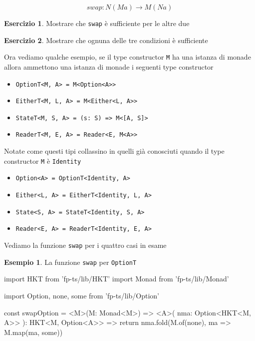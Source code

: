 \documentclass[12pt]{article}
\theoremstyle{definition}
\newtheorem{example}{Esempio}[section]
\newtheorem{exercise}{Esercizio}[section]
\newenvironment{code}
  {\vspace{0.5cm} \VerbatimEnvironment\begin{typescriptcode}}
  {\end{typescriptcode} \vspace{0.2cm}}
\begin{document}
$$
swap: N ( M a ) \rightarrow M ( N a )
$$

\begin{exercise}
Mostrare che \texttt{swap} è sufficiente per le altre due
\end{exercise}

\begin{exercise}
Mostrare che ognuna delle tre condizioni è sufficiente
\end{exercise}

Ora vediamo qualche esempio, se il type constructor \texttt{M} ha una istanza di monade
allora ammettono una istanza di monade i seguenti type constructor

\begin{itemize}
  \item \texttt{OptionT<M, A> = M<Option<A>>}
  \item \texttt{EitherT<M, L, A> = M<Either<L, A>>}
  \item \texttt{StateT<M, S, A> = (s: S) => M<[A, S]>}
  \item \texttt{ReaderT<M, E, A> = Reader<E, M<A>>}
\end{itemize}

Notate come questi tipi collassino in quelli già conosciuti quando il type constructor \texttt{M} è \texttt{Identity}

\begin{itemize}
  \item \texttt{Option<A> = OptionT<Identity, A>}
  \item \texttt{Either<L, A> = EitherT<Identity, L, A>}
  \item \texttt{State<S, A> = StateT<Identity, S, A>}
  \item \texttt{Reader<E, A> = ReaderT<Identity, E, A>}
\end{itemize}

Vediamo la funzione \texttt{swap} per i quattro casi in esame

\begin{example}
La funzione \texttt{swap} per \texttt{OptionT}

\begin{code}
import { HKT } from 'fp-ts/lib/HKT'
import { Monad } from 'fp-ts/lib/Monad'

import { Option, none, some } from 'fp-ts/lib/Option'

const swapOption = <M>(M: Monad<M>) => <A>(
  nma: Option<HKT<M, A>>
): HKT<M, Option<A>> => {
  return nma.fold(M.of(none), ma => M.map(ma, some))
}
\end{code}
\end{example}
\end{document}
